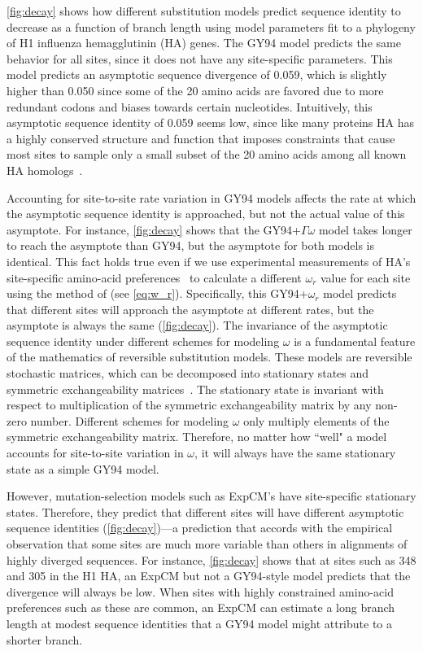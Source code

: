 \documentclass[11pt]{article}
\begin{document}
\ref{fig:decay} shows how different substitution models predict sequence identity to decrease as a function of branch length using model parameters fit to a phylogeny of H1 influenza hemagglutinin (HA) genes.
The GY94 model predicts the same behavior for all sites, since it does not have any site-specific parameters.
This model predicts an asymptotic sequence divergence of 0.059, which is slightly higher than 0.050 since some of the 20 amino acids are favored due to more redundant codons and biases towards certain nucleotides.
Intuitively, this asymptotic sequence identity of 0.059 seems low, since like many proteins HA has a highly conserved structure and function that imposes constraints that cause most sites to sample only a small subset of the 20 amino acids among all known HA homologs~\citep{nobusawa1991comparison}.

Accounting for site-to-site rate variation in GY94 models affects the rate at which the asymptotic sequence identity is approached, but not the actual value of this asymptote. 
For instance, \ref{fig:decay} shows that the GY94+$\Gamma\omega$ model takes longer to reach the asymptote than GY94, but the asymptote for both models is identical. 
This fact holds true even if we use experimental measurements of HA's site-specific amino-acid preferences~\citep{doud2016accurate} to calculate a different $\omega_r$ value for each site using the method of \citet{spielman2015relationship} (see \ref{eq:w_r}).
Specifically, this GY94+$\omega_r$ model predicts that different sites will approach the asymptote at different rates, but the asymptote is always the same (\ref{fig:decay}).
The invariance of the asymptotic sequence identity under different schemes for modeling $\omega$ is a fundamental feature of the mathematics of reversible substitution models.
These models are reversible stochastic matrices, which can be decomposed into stationary states and symmetric exchangeability matrices~\citep{nielsen2006statistical}.
The stationary state is invariant with respect to multiplication of the symmetric exchangeability matrix by any non-zero number.
Different schemes for modeling $\omega$ only multiply elements of the symmetric exchangeability matrix.
Therefore, no matter how ``well" a model accounts for site-to-site variation in $\omega$, it will always have the same stationary state as a simple GY94 model. 

However, mutation-selection models such as ExpCM's have site-specific stationary states.
Therefore, they predict that different sites will have different asymptotic sequence identities (\ref{fig:decay})---a prediction that accords with the empirical observation that some sites are much more variable than others in alignments of highly diverged sequences.
For instance, \ref{fig:decay} shows that at sites such as 348 and 305 in the H1 HA, an ExpCM but not a GY94-style model predicts that the divergence will always be low. 
When sites with highly constrained amino-acid preferences such as these are common, an ExpCM can estimate a long branch length at modest sequence identities that a GY94 model might attribute to a shorter branch.
\end{document}
